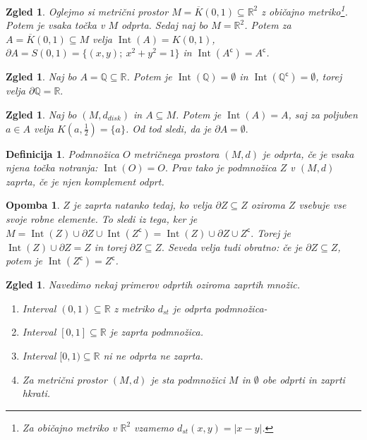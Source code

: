 \documentclass[10pt, a4paper]{article}
\newtheorem{defi}[izr]{Definicija}
\newenvironment{noticeB}{%
  \tcolorbox[%
  notitle,
  empty,
  enhanced,  %
  breakable,
  coltext=black,
  colback=white, 
  fontupper=\rmfamily,
  noparskip,
  sharp corners,
  boxrule=-1pt,  %
  frame hidden,
  left=7pt,  %
  right=7pt,
  top=5pt,
  bottom=5pt,
  before skip=2.5ex plus 2pt,
  after skip=2.5ex plus 2pt,
  borderline west = {1.5pt}{-0.1pt}{blue!30!black}, %
  overlay unbroken and last={%
    \draw[color=black, line width=1.25pt]
    ($(frame.south west)+(1.pt, -0.1pt)$) -- ++(2em, 0);
  }
  ]}
{\endtcolorbox}
\newenvironment{definicija}{\begin{noticeB}\begin{defi}}{%
\end{defi}\end{noticeB}}
\newtheorem*{opomba}{Opomba}
\newtheorem{zgled}[izr]{Zgled}
\newcommand{\stcomp}[1]{{#1}^{\mathsf{c}}}
\newcommand{\Q}{\mathbb {Q}}
\newcommand{\R}{\mathbb {R}}
\DeclareMathOperator{\Int}{Int}
\begin{document}
\begin{zgled}
    Oglejmo si metrični prostor $M = \overline{K}(0,1) \subseteq \R^2$ z običajno metriko\footnote{Za običajno metriko v $\R^2$ vzamemo $d_{st} (x,y) = |x - y|$.}.
    Potem je vsaka točka v $M$ odprta. Sedaj naj bo $M = \R^2$.
    Potem za $A = \overline{K}(0,1) \subseteq M$ velja $\Int(A) = K(0,1)$, $\partial A = S(0,1) = \{(x,y);\ x^2 + y^2 = 1\}$ in $\Int(\stcomp{A}) = \stcomp{A}$.
\end{zgled}

\begin{zgled}
    Naj bo $A = \Q \subseteq \R$. Potem je $\Int(\Q) = \emptyset$ in $\Int(\stcomp{\Q}) = \emptyset$, torej velja $\partial \Q = \R.$
\end{zgled}

\begin{zgled}
    Naj bo $(M, d_{disk})$ in $A \subseteq M$. Potem je $\Int(A) = A$, saj za poljuben $a \in A$ velja $K(a, \frac{1}{2}) = \{a\}$.
    Od tod sledi, da je $\partial A = \emptyset.$
\end{zgled}

\begin{definicija}
    Podmnožica $O$ metričnega prostora $(M, d)$ je odprta, če je vsaka njena točka notranja: $\Int(O) = O.$
    Prav tako je podmnožica $Z$ v $(M, d)$ zaprta, če je njen komplement odprt.
\end{definicija}

\begin{opomba}
    $Z$ je zaprta natanko tedaj, ko velja $\partial Z \subseteq Z$ oziroma $Z$ vsebuje vse svoje robne elemente.
    To sledi iz tega, ker je $M = \Int(Z) \cup \partial Z \cup \Int(\stcomp{Z}) = \Int(Z) \cup \partial Z \cup \stcomp{Z}.$
    Torej je $\Int(Z) \cup \partial Z = Z$ in torej $\partial Z \subseteq Z.$
    Seveda velja tudi obratno: če je $\partial Z \subseteq Z$, potem je $\Int(\stcomp{Z}) = \stcomp{Z}$.
\end{opomba}

\begin{zgled}
    Navedimo nekaj primerov odprtih oziroma zaprtih množic.
    \begin{enumerate}
        \item Interval $(0,1) \subseteq \R$ z metriko $d_{st}$ je odprta podmnožica-
        \item Interval $[0,1] \subseteq \R$ je zaprta podmnožica.
        \item Interval $[0, 1) \subseteq \R$ ni ne odprta ne zaprta.
        \item Za metrični prostor $(M, d)$ je sta podmnožici $M$ in $\emptyset$ obe odprti in zaprti hkrati. 
    \end{enumerate}
\end{zgled}
\end{document}
